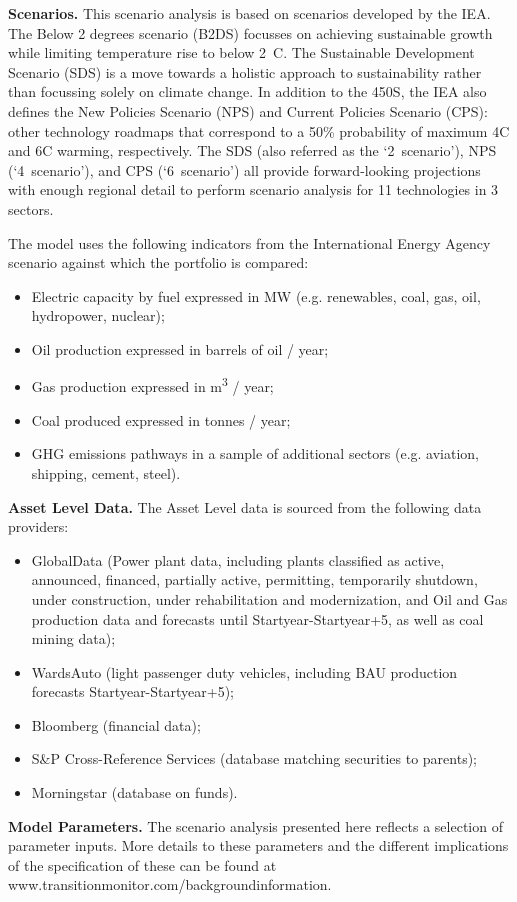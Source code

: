 \documentclass[10pt,table,a4]{article}\usepackage[]{graphicx}\usepackage[]{color}
\begin{document}
\begin{multicols}{2}
		\textbf{Scenarios.} This scenario analysis is based on scenarios developed by the IEA. The Below 2 degrees scenario (B2DS) focusses on achieving sustainable growth while limiting temperature rise to below 2\degree\ C. The Sustainable Development Scenario (SDS) is a move towards a holistic approach to sustainability rather than focussing solely on climate change. In addition to the 450S, the IEA also defines the New Policies Scenario (NPS) and Current Policies Scenario (CPS): other technology roadmaps that correspond to a 50\% probability of maximum 4\degree C and 6\degree C warming, respectively. The SDS (also referred as the `2\degree\ scenario'), NPS (`4\degree\ scenario'), and CPS (`6\degree\ scenario') all provide forward-looking projections with enough regional detail to perform scenario analysis for 11 technologies in 3 sectors.
		
		The model uses the following indicators from the International Energy Agency scenario against which the portfolio is compared:
		\begin{itemize}
			\item{Electric capacity by fuel expressed in MW (e.g. renewables, coal, gas, oil, hydropower, nuclear);}
			\item{Oil production expressed in barrels of oil / year;}
			\item{Gas production expressed in m\textsuperscript{3} / year;}
			\item{Coal produced expressed in tonnes / year;}
			\item{GHG emissions pathways in a sample of additional sectors (e.g. aviation, shipping, cement, steel).}
		\end{itemize}
		
		 
		\textbf{Asset Level Data.} The Asset Level data is sourced from the following data providers: 
		\begin{itemize}
			\item{GlobalData (Power plant data, including plants classified as active, announced, financed, partially active, permitting, temporarily shutdown, under construction, under rehabilitation and modernization, and Oil and Gas production data and forecasts until Startyear-Startyear+5, as well as coal mining data); }
			\item{WardsAuto (light passenger duty vehicles, including BAU production forecasts Startyear-Startyear+5); }
			\item{Bloomberg (financial data);}
			\item{S\&P Cross-Reference Services (database matching securities to parents);}
			\item{Morningstar (database on funds). }
			
		\end{itemize}
		
		\textbf{Model Parameters.} The scenario analysis presented here reflects a selection of parameter inputs. More details to these parameters and the different implications of the specification of these can be found at www.transitionmonitor.com/backgroundinformation. 
		
		
		
	\end{multicols}
	
\end{document}
